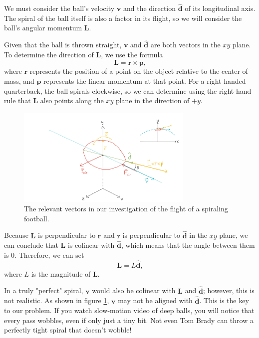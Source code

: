 \documentclass{article}
\begin{document}
We must consider the ball's velocity $\mathbf{v}$ and the direction $\mathbf{\hat{d}}$ of its longitudinal axis. The spiral of the ball itself is also a factor in its flight, so we will consider the ball's angular momentum $\mathbf{L}$.

Given that the ball is thrown straight, $\mathbf{v}$ and $\mathbf{\hat{d}}$ are both vectors in the $xy$ plane. To determine the direction of $\mathbf{L}$, we use the formula
\begin{equation}
    \mathbf{L} = \mathbf{r} \times \mathbf{p} \text{,}
\end{equation}
where $\mathbf{r}$ represents the position of a point on the object relative to the center of mass, and $\mathbf{p}$ represents the linear momentum at that point. For a right-handed quarterback, the ball spirals clockwise, so we can determine using the right-hand rule that $\mathbf{L}$ also points along the $xy$ plane in the direction of $+y$.

\begin{figure}[h]
\centering
    \includegraphics[width=0.75\textwidth]{img/vectors.png}
    \caption{The relevant vectors in our investigation of the flight of a spiraling football.}
    \label{vectors}
\end{figure}

Because $\mathbf{L}$ is perpendicular to $\mathbf{r}$ and $\mathbf{r}$ is perpendicular to $\mathbf{\hat{d}}$ in the $xy$ plane, we can conclude that $\mathbf{L}$ is colinear with $\mathbf{\hat{d}}$, which means that the angle between them is $0$. Therefore, we can set
\begin{equation}\label{L}
    \mathbf{L} = L\mathbf{\hat{d}}\text{,}
\end{equation}
where $L$ is the magnitude of $\mathbf{L}$.

In a truly "perfect" spiral, $\mathbf{v}$ would also be colinear with $\mathbf{L}$ and $\mathbf{\hat{d}}$; however, this is not realistic. As shown in figure \ref{vectors}, $\mathbf{v}$ may not be aligned with $\mathbf{\hat{d}}$. This is the key to our problem. If you watch slow-motion video of deep balls, you will notice that every pass wobbles, even if only just a tiny bit. Not even Tom Brady can throw a perfectly tight spiral that doesn't wobble! 
\end{document}

